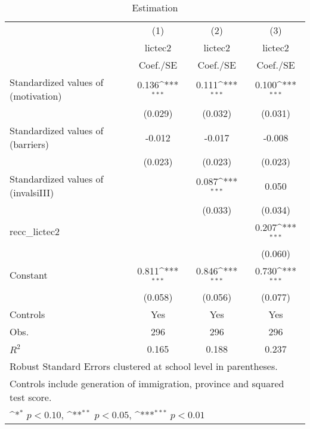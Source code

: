 \begin{table}[htbp]\centering
\def\sym#1{\ifmmode^{#1}\else\(^{#1}\)\fi}
\caption{Estimation \label{Table6a}}
\begin{tabular}{l*{3}{c}}
\toprule
                    &\multicolumn{1}{c}{(1)}&\multicolumn{1}{c}{(2)}&\multicolumn{1}{c}{(3)}\\
                    &\multicolumn{1}{c}{lictec2}&\multicolumn{1}{c}{lictec2}&\multicolumn{1}{c}{lictec2}\\
                    &    Coef./SE         &    Coef./SE         &    Coef./SE         \\
\midrule
Standardized values of (motivation)     &       0.136\sym{***}&       0.111\sym{***}&       0.100\sym{***}\\
                    &     (0.029)         &     (0.032)         &     (0.031)         \\
Standardized values of (barriers)     &      -0.012         &      -0.017         &      -0.008         \\
                    &     (0.023)         &     (0.023)         &     (0.023)         \\
Standardized values of (invalsiIII)     &                     &       0.087\sym{***}&       0.050         \\
                    &                     &     (0.033)         &     (0.034)         \\
recc\_lictec2        &                     &                     &       0.207\sym{***}\\
                    &                     &                     &     (0.060)         \\
Constant            &       0.811\sym{***}&       0.846\sym{***}&       0.730\sym{***}\\
                    &     (0.058)         &     (0.056)         &     (0.077)         \\
Controls            &         Yes         &         Yes         &         Yes         \\
\midrule
Obs.                &         296         &         296         &         296         \\
\(R^{2}\)           &       0.165         &       0.188         &       0.237         \\
\bottomrule
\multicolumn{4}{l}{\footnotesize Robust Standard Errors clustered at school level in parentheses.}\\
\multicolumn{4}{l}{\footnotesize Controls include generation of immigration, province and squared test score.}\\
\multicolumn{4}{l}{\footnotesize \sym{*} \(p<0.10\), \sym{**} \(p<0.05\), \sym{***} \(p<0.01\)}\\
\end{tabular}
\end{table}
